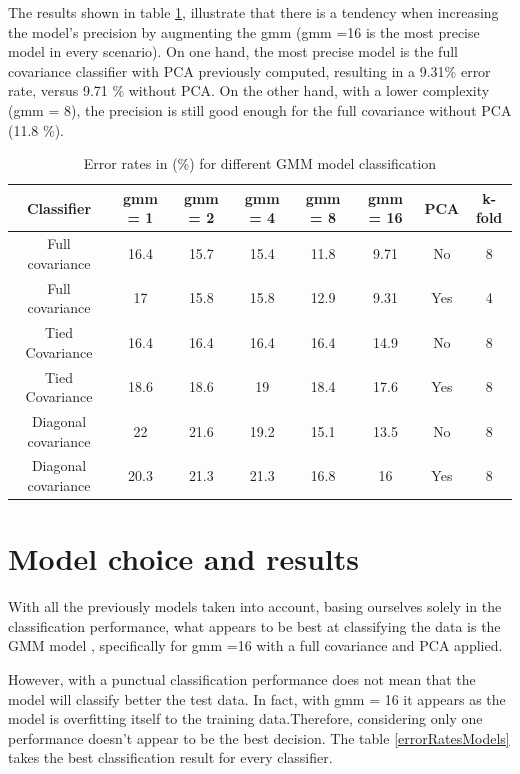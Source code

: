 \documentclass[twoside,a4paper,12pt]{report}
\begin{document}
The results shown in table \ref{errorRatesGMMs}, illustrate that there is a tendency 
when increasing the model's precision by augmenting the gmm (gmm =16 is the most precise model
in every scenario). On one hand, the most precise model is the full covariance classifier with PCA previously computed,
resulting in a 9.31\% error rate, versus 9.71 \% without PCA. On the other hand, with a lower complexity (gmm = 8),
the precision is still good enough for the full covariance without PCA (11.8 \%).


\begin{table}[H]
    \centering
     \begin{tabular}{||c c c c c c c c||} 
        \hline \hline
        Classifier & gmm = 1 & gmm = 2 & gmm = 4 & gmm = 8 &gmm = 16 & PCA & k-fold\\
        \hline\hline
        Full covariance &  16.4 &  15.7 &  15.4 & \cellcolor{blue!25}  11.8 & \cellcolor{blue!25} 9.71 & No & 8  \\ 
        \hline
        Full covariance &  17 &  15.8 &  15.8 &  12.9 & \cellcolor{blue!25} 9.31 & Yes & 4  \\ 
        \hline
        Tied Covariance &  16.4 &  16.4 & 16.4 &  16.4 & 14.9  & No & 8  \\
        \hline
        Tied Covariance &  18.6 &  18.6 & 19 &  18.4 & 17.6  & Yes & 8  \\
        \hline
        Diagonal covariance  &  22 &  21.6 & 19.2 &  15.1 & 13.5  & No & 8 \\
        \hline
        Diagonal covariance &20.3 &  21.3 & 21.3&  16.8  & 16 & Yes & 8\\
        \hline \hline
    \end{tabular}
    \caption{Error rates in (\%) for different GMM model classification    \label{errorRatesGMMs}    }
\end{table}

    

\section{Model choice and results}
With all the previously models taken into account, basing ourselves solely 
in the classification performance, what appears to be best at
classifying the data is the GMM model , specifically for gmm =16 with a full covariance and PCA applied.

However, with a punctual classification performance does not mean that the model
will classify better the test data. In fact, with gmm = 16 it appears as 
the model is overfitting itself to the training data.Therefore, considering 
only one performance doesn't appear to be the best decision. The table \ref{errorRatesModels}
takes the best classification result for every classifier.
\end{document}
